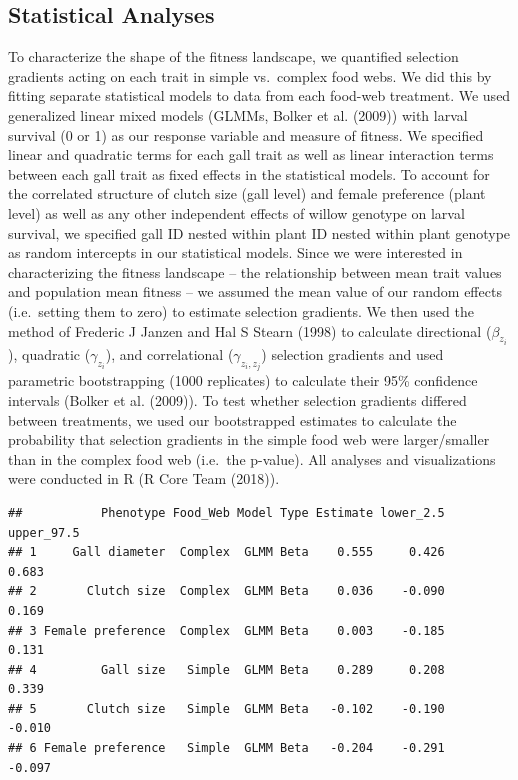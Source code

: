 \documentclass[]{elsarticle} %
\begin{document}
\subsection{Statistical Analyses}\label{statistical-analyses}

To characterize the shape of the fitness landscape, we quantified
selection gradients acting on each trait in simple vs.~complex food
webs. We did this by fitting separate statistical models to data from
each food-web treatment. We used generalized linear mixed models (GLMMs,
Bolker et al. (2009)) with larval survival (0 or 1) as our response
variable and measure of fitness. We specified linear and quadratic terms
for each gall trait as well as linear interaction terms between each
gall trait as fixed effects in the statistical models. To account for
the correlated structure of clutch size (gall level) and female
preference (plant level) as well as any other independent effects of
willow genotype on larval survival, we specified gall ID nested within
plant ID nested within plant genotype as random intercepts in our
statistical models. Since we were interested in characterizing the
fitness landscape -- the relationship between mean trait values and
population mean fitness -- we assumed the mean value of our random
effects (i.e.~setting them to zero) to estimate selection gradients. We
then used the method of Frederic J Janzen and Hal S Stearn (1998) to
calculate directional (\(\beta_{z_i}\)), quadratic (\(\gamma_{z_i}\)),
and correlational (\(\gamma_{z_i,z_j}\)) selection gradients and used
parametric bootstrapping (1000 replicates) to calculate their 95\%
confidence intervals (Bolker et al. (2009)). To test whether selection
gradients differed between treatments, we used our bootstrapped
estimates to calculate the probability that selection gradients in the
simple food web were larger/smaller than in the complex food web
(i.e.~the p-value). All analyses and visualizations were conducted in R
(R Core Team (2018)).

\begin{verbatim}
##           Phenotype Food_Web Model Type Estimate lower_2.5 upper_97.5
## 1     Gall diameter  Complex  GLMM Beta    0.555     0.426      0.683
## 2       Clutch size  Complex  GLMM Beta    0.036    -0.090      0.169
## 3 Female preference  Complex  GLMM Beta    0.003    -0.185      0.131
## 4         Gall size   Simple  GLMM Beta    0.289     0.208      0.339
## 5       Clutch size   Simple  GLMM Beta   -0.102    -0.190     -0.010
## 6 Female preference   Simple  GLMM Beta   -0.204    -0.291     -0.097
\end{verbatim}
\end{document}
